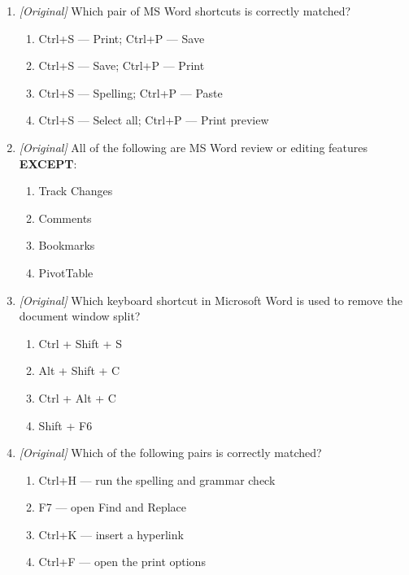 \documentclass[11pt]{article}
\begin{document}
\begin{enumerate}[label=\textbf{Q\arabic*.}, leftmargin=*]
\begin{enumerate}[label=\Alph*.]
    \item Portable Document Format
    \item Public Data Format
    \item Personal Document Folder
  \end{enumerate}
\item \textit{[Original]} Which pair of MS Word shortcuts is correctly matched?
  \begin{enumerate}[label=\Alph*.]
    \item Ctrl+S --- Print; Ctrl+P --- Save
    \item Ctrl+S --- Save; Ctrl+P --- Print
    \item Ctrl+S --- Spelling; Ctrl+P --- Paste
    \item Ctrl+S --- Select all; Ctrl+P --- Print preview
  \end{enumerate}
\item \textit{[Original]} All of the following are MS Word review or editing
  features \textbf{EXCEPT}:
  \begin{enumerate}[label=\Alph*.]
    \item Track Changes
    \item Comments
    \item Bookmarks
    \item PivotTable
  \end{enumerate}
\item \textit{[Original]} Which keyboard shortcut in Microsoft
Word is used to remove the document window split?
  \begin{enumerate}[label=\Alph*.]
    \item Ctrl + Shift + S
    \item Alt + Shift + C
    \item Ctrl + Alt + C
    \item Shift + F6
  \end{enumerate}
\item \textit{[Original]} Which of the following pairs is correctly matched?
  \begin{enumerate}[label=\Alph*.]
    \item Ctrl+H --- run the spelling and grammar check
    \item F7 --- open Find and Replace
    \item Ctrl+K --- insert a hyperlink
    \item Ctrl+F --- open the print options
  \end{enumerate}


\end{enumerate}
\end{document}
